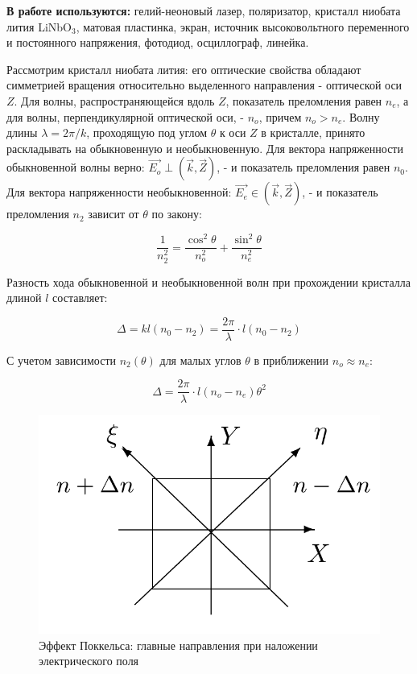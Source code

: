 \documentclass[a4paper, 12pt]{article}%
\begin{document}
\textbf{В работе используются:} гелий-неоновый лазер, поляризатор, кристалл ниобата лития LiNbO$_3$, матовая пластинка, экран, источник высоковольтного переменного и постоянного напряжения, фотодиод, осциллограф, линейка.
	

Рассмотрим кристалл ниобата лития: его оптические свойства обладают симметрией вращения относительно выделенного направления - оптической оси $Z$. Для волны, распространяющейся вдоль $Z$, показатель преломления равен $n_e$, а для волны, перпендикулярной оптической оси, - $n_o$, причем $n_o > n_e$. Волну длины $\lambda = 2\pi/k$, проходящую под углом $\theta$ к оси $Z$ в кристалле, принято раскладывать на обыкновенную и необыкновенную. Для вектора напряженности обыкновенной волны верно: $\overrightarrow{E_o} \perp (\overrightarrow{k}, \overrightarrow{Z})$, - и показатель преломления равен $n_0$. Для вектора напряженности необыкновенной: $\overrightarrow{E_e} \in (\overrightarrow{k}, \overrightarrow{Z})$, - и показатель преломления $n_2$ зависит от $\theta$ по закону:
	
	\[ \frac{1}{n_2^2} = \frac{\cos^2\theta}{n_o^2} + \frac{\sin^2\theta}{n_e^2} \]
	
	Разность хода обыкновенной и необыкновенной волн при прохождении кристалла длиной $l$ составляет: 
	
	\[ \Delta = kl(n_0 - n_2) = \frac{2\pi}{\lambda} \cdot l (n_0 - n_2) \]
	
	С учетом зависимости $n_2(\theta)$ для малых углов $\theta$ в приближении $n_o \approx n_e$: 
	
	\begin{equation}
		\Delta = \frac{2\pi}{\lambda}\cdot l (n_o - n_e)\theta^2 
	\end{equation}
	
		\begin{figure} 
		\includegraphics[width=\linewidth]{maindir}
		\caption{Эффект Поккельса: главные направления при наложении электрического поля}
		\label{dir}
	\end{figure}
	
\end{document}
